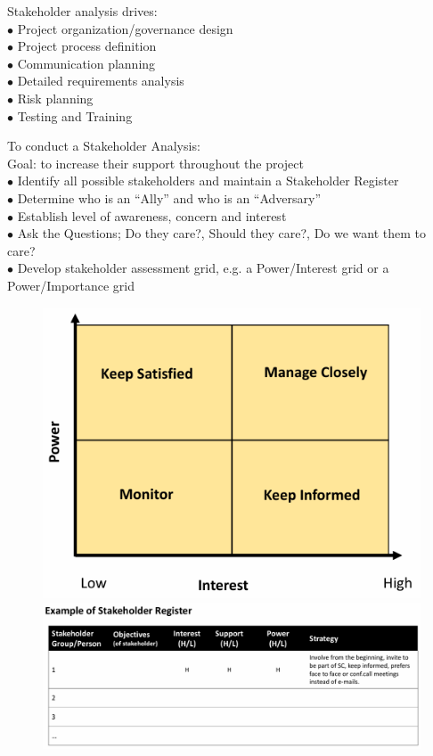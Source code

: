\documentclass[]{project_plan}
\newcommand{\bulletPoint}{\hspace{-3.1pt}$\bullet$ \hspace{5pt}}
\begin{document}
Stakeholder analysis drives:\\
\bulletPoint Project organization/governance design\\
\bulletPoint Project process definition\\
\bulletPoint Communication planning\\
\bulletPoint Detailed requirements analysis\\
\bulletPoint Risk planning\\
\bulletPoint Testing and Training

To conduct a Stakeholder Analysis:\\
Goal: to increase their support throughout the project\\
\bulletPoint Identify all possible stakeholders and maintain a Stakeholder Register\\
\bulletPoint Determine who is an “Ally” and who is an “Adversary”\\
\bulletPoint Establish level of awareness, concern and interest\\
\bulletPoint Ask the Questions; Do they care?, Should they care?, Do we want them to care?\\
\bulletPoint Develop stakeholder assessment grid, e.g. a Power/Interest grid or a Power/Importance grid

\begin{figure}[h!]
  \centering
  \includegraphics[width=.6\linewidth]{stakeholder_assessment_grid.png}
  \includegraphics[width=\linewidth]{stakeholder_register.png}
\end{figure}
\end{document}
